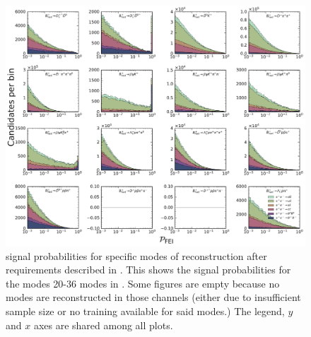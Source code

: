 \begin{figure}[htbp!]
    \ContinuedFloat
    \centering
    \includegraphics[width=1\textwidth]{figures/appendices/FEI_signal_probabilities/Bp_feiSigProbs2.pdf}
    \caption{\label{fig:feisigprobs2} \FEI signal probabilities for specific modes of \Bp reconstruction after requirements described in .
    This shows the signal probabilities for the modes 20-36 \Bp modes in .
    Some figures are empty because no modes are reconstructed in those channels (either due to insufficient sample size or no training available for said modes.)
    The legend, $y$ and $x$ axes are shared among all plots.
    }
\end{figure}


